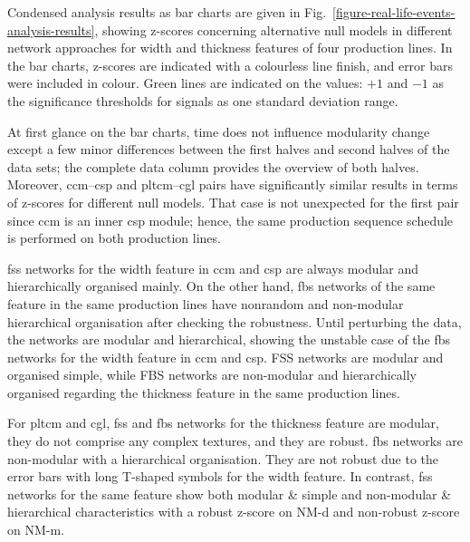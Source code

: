 Condensed analysis results as bar charts are given in Fig.~\ref{figure-real-life-events-analysis-results}, showing z-scores concerning alternative null models in different network approaches for width and thickness features of four production lines. In the bar charts, z-scores are indicated with a colourless line finish, and error bars were included in colour. Green lines are indicated on the values: $+1$ and $-1$ as the significance thresholds for signals as one standard deviation range.
\renewcommand{\aa}{Analysis Bar Chart Results:}


\newcommand{\bb}{Modularity Values and Z-scores in Different Network Resolutions}
\newcommand{\cc}{Analysis Curve Plot Results:}
\newcommand{\dd}{Modularity Values and Z-scores in Sliding-time Windows \& Different Network Resolutions}
\newcommand{\ee}{Modularity Values and Z-scores in Discrete-time Windows}

At first glance on the bar charts, time does not influence modularity change except a few minor differences between the first halves and second halves of the data sets; the complete data column provides the overview of both halves. Moreover, \acs{ccm}--\acs{csp} and \acs{pltcm}--\acs{cgl} pairs have significantly similar results in terms of z-scores for different null models. That case is not unexpected for the first pair since \acs{ccm} is an inner \acs{csp} module; hence, the same production sequence schedule is performed on both production lines.

\acs{fss} networks for the width feature in \acs{ccm} and \acs{csp} are always modular and hierarchically organised mainly. On the other hand, \acs{fbs} networks of the same feature in the same production lines have nonrandom and non-modular hierarchical organisation after checking the robustness. Until perturbing the data, the networks are modular and hierarchical, showing the unstable case of the \acs{fbs} networks for the width feature in \acs{ccm} and \acs{csp}. FSS networks are modular and organised simple, while FBS networks are non-modular and hierarchically organised regarding the thickness feature in the same production lines. 

For \acs{pltcm} and \acs{cgl}, \acs{fss} and \acs{fbs} networks for the thickness feature are modular, they do not comprise any complex textures, and they are robust. \acs{fbs} networks are non-modular with a hierarchical organisation. They are not robust due to the error bars with long T-shaped symbols for the width feature. In contrast, \acs{fss} networks for the same feature show both modular \& simple and non-modular \& hierarchical characteristics with a robust z-score on NM-d and non-robust z-score on NM-m.

